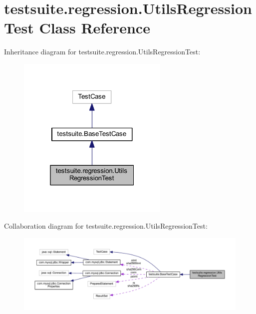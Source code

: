 \hypertarget{classtestsuite_1_1regression_1_1_utils_regression_test}{}\section{testsuite.\+regression.\+Utils\+Regression\+Test Class Reference}
\label{classtestsuite_1_1regression_1_1_utils_regression_test}


Inheritance diagram for testsuite.\+regression.\+Utils\+Regression\+Test\+:
\nopagebreak
\begin{figure}[H]
\begin{center}
\leavevmode
\includegraphics[width=205pt]{classtestsuite_1_1regression_1_1_utils_regression_test__inherit__graph}
\end{center}
\end{figure}


Collaboration diagram for testsuite.\+regression.\+Utils\+Regression\+Test\+:
\nopagebreak
\begin{figure}[H]
\begin{center}
\leavevmode
\includegraphics[width=350pt]{classtestsuite_1_1regression_1_1_utils_regression_test__coll__graph}
\end{center}
\end{figure}
